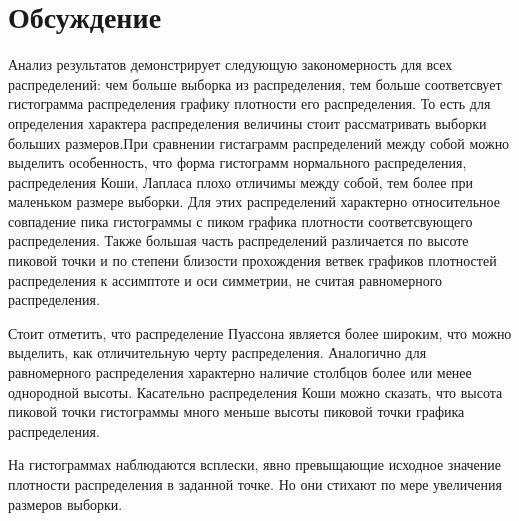 ﻿\documentclass[12pt,a4paper]{article}
\begin{document}
\section{Обсуждение}
Анализ результатов демонстрирует следующую закономерность для всех распределений: чем больше выборка из распределения, тем больше соответсвует гистограмма распределения графику плотности его распределения. То есть для определения характера распределения величины стоит рассматривать выборки больших размеров.При сравнении гистаграмм распределений между собой можно выделить особенность, что форма гистограмм нормального распределения, распределения Коши, Лапласа плохо отличимы между собой, тем более при маленьком размере выборки. Для этих распределений характерно относительное совпадение пика гистограммы с пиком графика плотности соответсвующего распределения. Также большая часть распределений различается по высоте пиковой точки и по степени близости прохождения ветвек графиков плотностей распределения к ассимптоте и оси симметрии, не считая равномерного распределения.

Стоит отметить, что распределение Пуассона является более широким, что можно выделить, как отличительную черту распределения. Аналогично для равномерного распределения характерно наличие столбцов более или менее однородной высоты. Касательно распределения Коши можно сказать, что высота пиковой точки гистограммы много меньше высоты пиковой точки графика распределения.

На гистограммах наблюдаются всплески, явно превыщающие исходное значение плотности распределения в заданной точке. Но они стихают по мере увеличения размеров выборки.
\end{document}
